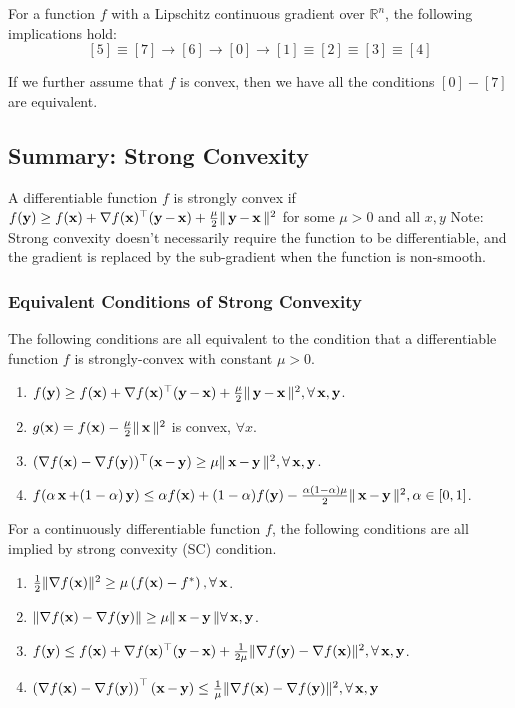 For a function $f$ with a Lipschitz continuous gradient over $\mathbb{R}^{n}$, the following implications hold:
$$
[5] \equiv[7] \rightarrow[6] \rightarrow[0] \rightarrow[1] \equiv[2] \equiv[3] \equiv[4]
$$

If we further assume that $f$ is convex, then we have all the conditions $[0]-[7]$ are equivalent.




\subsection*{Summary: Strong Convexity}
A differentiable function $f$ is strongly convex if
$
f(\y) \geq f(\x)+\nabla f(\x)^{\top}(\y-\x)+\frac{\mu}{2}\|\y-\x\|^{2}
$
for some $\mu>0$ and all $x, y$
Note: Strong convexity doesn't necessarily require the function to be differentiable, and the gradient is replaced by the sub-gradient when the function is non-smooth.

\subsubsection*{Equivalent Conditions of Strong Convexity}
The following conditions are all equivalent to the condition that a differentiable function $f$ is strongly-convex with constant $\mu>0$.
\begin{enumerate}[label = (\roman*), leftmargin=*]
\item $f(\y) \geq f(\x)+\nabla f(\x)^{\top}(\y-\x)+\frac{\mu}{2}\|\y-\x\|^{2}, \forall \x, \y$.
\item $g(\x)=f(\x)-\frac{\mu}{2}\|\x\|^{2}$ is convex, $\forall x$.
\item $(\nabla f(\x)-\nabla f(\y))^{\top}(\x-\y) \geq \mu\|\x-\y\|^{2}, \forall \x, \y$.
\item $f(\alpha \x+(1-\alpha) \y) \leq \alpha f(\x)+(1-\alpha) f(\y)-\frac{\alpha(1-\alpha) \mu}{2}\|\x-\y\|^{2}, \alpha \in[0,1]$.
\end{enumerate}

For a continuously differentiable function $f$, the following conditions are all implied by strong convexity (SC) condition.
\begin{enumerate}[label = (\alph*), leftmargin=*]
\item $\frac{1}{2}\|\nabla f(\x)\|^{2} \geq \mu\left(f(\x)-f^{*}\right), \forall \x$.
\item $\|\nabla f(\x)-\nabla f(\y)\| \geq \mu\|\x-\y\| \forall \x, \y$.
\item $f(\y) \leq f(\x)+\nabla f(\x)^{\top}(\y-\x)+\frac{1}{2 \mu}\|\nabla f(\y)-\nabla f(\x)\|^{2}, \forall \x, \y$.
\item $\left(\nabla f(\x)-\nabla f(\y)\right)^{\top}(\x-\y) \leq \frac{1}{\mu}\|\nabla f(\x)-\nabla f(\y)\|^{2}, \forall \x, \y$
\end{enumerate}

